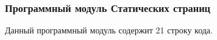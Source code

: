 \subsubsection{Программный модуль \textbf{Статических страниц}}

Данный программный модуль содержит 21 строку кода.
